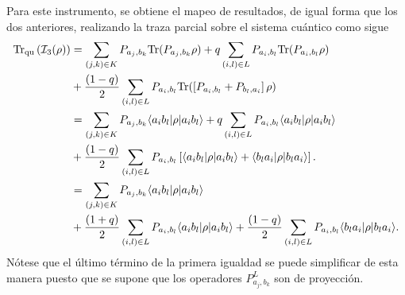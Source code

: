 Para este instrumento, se obtiene el mapeo de resultados, de igual forma que los dos anteriores, realizando la traza parcial sobre el sistema cuántico como sigue\begin{equation}\label{eq:traza_q_3instrument2p}
    \begin{split}
       {\rm Tr}_{\text{qu}}\left( \mathcal{I}_3(\rho)\right)&=\sum_{(j,k)\in K}  P_{a_j,b_k}{\rm Tr}(P_{a_j,b_k}\rho)+q\sum_{(i,l)\in L}P_{a_i,b_l} {\rm Tr}(P_{a_i,b_l}\rho) \\
        &+\dfrac{(1-q)}{2}\sum_{(i,l) \in L}P_{a_i,b_l} {\rm Tr}(\left[P_{a_i,b_l}+P_{b_l,a_i}\right]\rho)\\
        &=\sum_{(j,k)\in K}  P_{a_j,b_k}\langle a_i b_l|\rho|a_i b_l\rangle +q\sum_{(i,l)\in L}P_{a_i,b_l} \langle a_i b_l|\rho|a_i b_l\rangle \\
        &+\dfrac{(1-q)}{2}\sum_{(i,l) \in L}P_{a_i,b_l} \left[ \langle a_i b_l|\rho|a_i b_l\rangle + \langle b_l a_i|\rho| b_l a_i\rangle \right].\\
        &=\sum_{(j,k)\in K}  P_{a_j,b_k}\langle a_i b_l|\rho|a_i b_l\rangle \\
        &+\dfrac{(1+q)}{2}\sum_{(i,l)\in L}P_{a_i,b_l} \langle a_i b_l|\rho|a_i b_l\rangle +\dfrac{(1-q)}{2}\sum_{(i,l) \in L}P_{a_i,b_l} \langle b_l a_i|\rho| b_l a_i\rangle.\\
    \end{split}
\end{equation}Nótese que el último término de la primera igualdad  se puede simplificar de esta manera puesto que se supone que los operadores $P_{a_j,b_k}^L$ son de proyección. 







